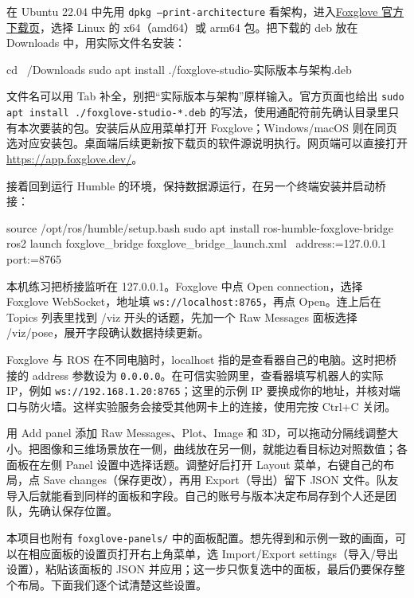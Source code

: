 \begin{example}
在 Ubuntu 22.04 中先用 \texttt{dpkg --print-architecture} 看架构，进入\href{https://foxglove.dev/download}{Foxglove 官方下载页}，选择 Linux 的 x64（amd64）或 arm64 包。把下载的 deb 放在 Downloads 中，用实际文件名安装：
\par\medskip\noindent\begin{minipage}{\linewidth}
\begin{tbash}
cd ~/Downloads
sudo apt install ./foxglove-studio-实际版本与架构.deb
\end{tbash}
\end{minipage}\par\smallskip
文件名可以用 Tab 补全，别把“实际版本与架构”原样输入。官方页面也给出 \texttt{sudo apt install ./foxglove-studio-*.deb} 的写法，使用通配符前先确认目录里只有本次要装的包。安装后从应用菜单打开 Foxglove；Windows/macOS 则在同页选对应安装包。桌面端后续更新按下载页的软件源说明执行。网页端可以直接打开 \url{https://app.foxglove.dev/}。

接着回到运行 Humble 的环境，保持数据源运行，在另一个终端安装并启动桥接：
\par\medskip\noindent\begin{minipage}{\linewidth}
\begin{tbash}
source /opt/ros/humble/setup.bash
sudo apt install ros-humble-foxglove-bridge
ros2 launch foxglove_bridge foxglove_bridge_launch.xml \
  address:=127.0.0.1 port:=8765
\end{tbash}
\end{minipage}\par\smallskip
本机练习把桥接监听在 127.0.0.1。Foxglove 中点 Open connection，选择 Foxglove WebSocket，地址填 \texttt{ws://localhost:8765}，再点 Open。连上后在 Topics 列表里找到 /viz 开头的话题，先加一个 Raw Messages 面板选择 /viz/pose，展开字段确认数据持续更新。

Foxglove 与 ROS 在不同电脑时，localhost 指的是查看器自己的电脑。这时把桥接的 address 参数设为 \texttt{0.0.0.0}。在可信实验网里，查看器填写机器人的实际 IP，例如 \nolinkurl{ws://192.168.1.20:8765}；这里的示例 IP 要换成你的地址，并核对端口与防火墙。这样实验服务会接受其他网卡上的连接，使用完按 Ctrl+C 关闭。

用 Add panel 添加 Raw Messages、Plot、Image 和 3D，可以拖动分隔线调整大小。把图像和三维场景放在一侧，曲线放在另一侧，就能边看目标边对照数值；各面板在左侧 Panel 设置中选择话题。调整好后打开 Layout 菜单，右键自己的布局，点 Save changes（保存更改），再用 Export（导出）留下 JSON 文件。队友导入后就能看到同样的面板和字段。自己的账号与版本决定布局存到个人还是团队，先确认保存位置。

本项目也附有 \texttt{foxglove-panels/} 中的面板配置。想先得到和示例一致的画面，可以在相应面板的设置页打开右上角菜单，选 Import/Export settings（导入/导出设置），粘贴该面板的 JSON 并应用；这一步只恢复选中的面板，最后仍要保存整个布局。下面我们逐个试清楚这些设置。
\end{example}

